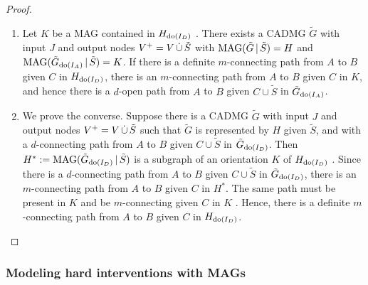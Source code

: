 \begin{proof}
  \begin{enumerate}
    \item Let $K$ be a MAG contained in $H_{\operatorname{do}(I_D)}$ . 
      There exists a CADMG $\tilde{G}$ with input $J$ and output nodes $V^+ = V \,\dot{\cup}\, \tilde{S}$ with $\mathrm{MAG}(\tilde{G} \operatorname*{|} \tilde{S}) = H$ and $\mathrm{MAG}(\tilde{G}_{\operatorname{do}(I_A)} \operatorname*{|} \tilde{S}) = K$.
      If there is a definite $m$-connecting path from $A$ to $B$ given $C$ in $H_{\operatorname{do}(I_D)}$, there is an $m$-connecting path from $A$ to $B$ given $C$ in $K$,
      and hence there is a $d$-open path from $A$ to $B$ given $C \cup \tilde{S}$ in $\tilde{G}_{\operatorname{do}(I_A)}$.
    \item We prove the converse.
      Suppose there is a CADMG $\tilde{G}$ with input $J$ and output nodes $V^+ = V \,\dot{\cup}\, \tilde{S}$ such that $\tilde{G}$ is represented by $H$ given $\tilde{S}$, and with a $d$-connecting path from $A$ to $B$ given $C \cup \tilde{S}$ in $\tilde{G}_{\operatorname{do}(I_D)}$.
      Then $H^* := \mathrm{MAG}(\tilde{G}_{\operatorname{do}(I_D)} \operatorname*{|} \tilde{S})$ is a subgraph of an orientation $K$ of $H_{\operatorname{do}(I_D)}$ .
      Since there is a $d$-connecting path from $A$ to $B$ given $C \cup \tilde{S}$ in $\tilde{G}_{\operatorname{do}(I_D)}$,
      there is an $m$-connecting path from $A$ to $B$ given $C$ in $H^*$.
      The same path must be present in $K$ and be $m$-connecting given $C$ in $K$ .
      Hence, there is a definite $m$-connecting path from $A$ to $B$ given $C$ in $H_{\operatorname{do}(I_D)}$.
  \end{enumerate}
\end{proof}


\subsubsection{Modeling hard interventions with MAGs}

